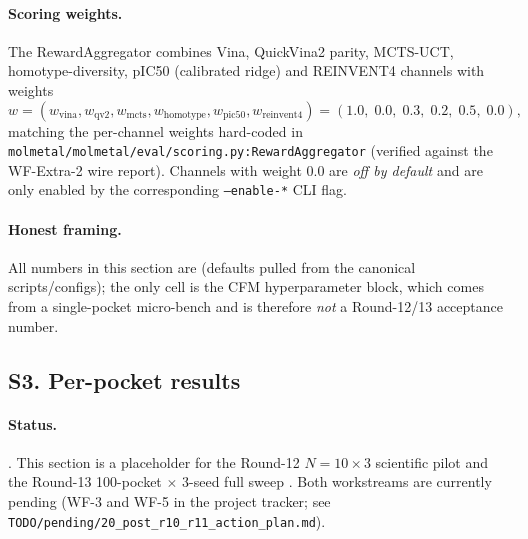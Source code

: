 \paragraph{Scoring weights.}
The RewardAggregator combines Vina, QuickVina2 parity, MCTS-UCT,
homotype-diversity, pIC50 (calibrated ridge) and REINVENT4 channels
with weights
\begin{equation}
  \label{eq:reward-weights}
  w = (w_{\text{vina}}, w_{\text{qv2}}, w_{\text{mcts}}, w_{\text{homotype}}, w_{\text{pic50}}, w_{\text{reinvent4}})
  = (1.0,\; 0.0,\; 0.3,\; 0.2,\; 0.5,\; 0.0),
\end{equation}
matching the per-channel weights hard-coded in
\texttt{molmetal/molmetal/eval/scoring.py:RewardAggregator} (verified
against the WF-Extra-2 wire report).  Channels with weight $0.0$ are
\emph{off by default} and are only enabled by the corresponding
\texttt{--enable-*} CLI flag.

\paragraph{Honest framing.}
All numbers in this section are \DESIGN{} (defaults pulled from the
canonical scripts/configs); the only \MEASURED{} cell is the CFM
hyperparameter block, which comes from a single-pocket micro-bench and
is therefore \emph{not} a Round-12/13 acceptance number.


\subsection*{S3. Per-pocket results}
\label{supp:s3-per-pocket}

\paragraph{Status.}
\DESIGN{}.  This section is a placeholder for the Round-12
$N{=}10{\times}3$ scientific pilot \cite{footnote:round12_pilot} and the
Round-13 100-pocket $\times$ 3-seed full sweep \cite{footnote:round13_sweep}.
Both workstreams are currently pending (WF-3 and WF-5 in the project
tracker; see \texttt{TODO/pending/20\_post\_r10\_r11\_action\_plan.md}).

